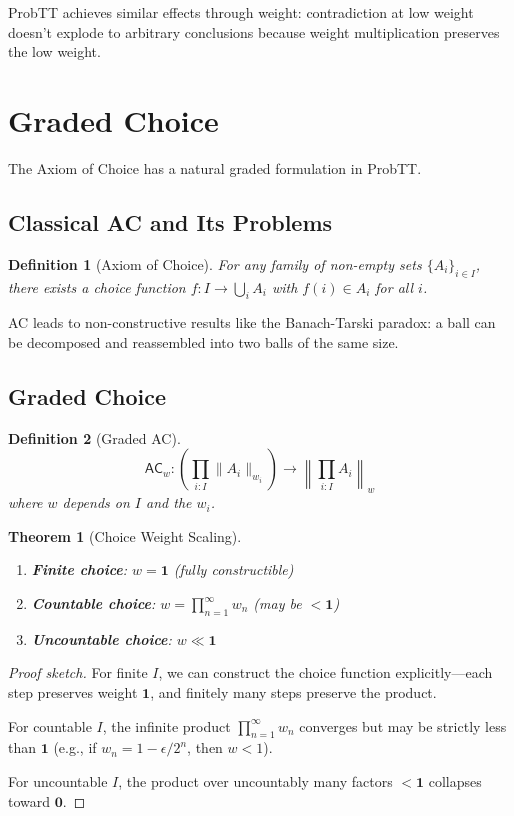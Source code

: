 \documentclass[11pt,a4paper]{article}
\newtheorem{definition}{Definition}[section]
\newtheorem{theorem}{Theorem}[section]
\newcommand{\one}{\mathbf{1}}
\newcommand{\zero}{\mathbf{0}}
\begin{document}
ProbTT achieves similar effects through weight: contradiction at low weight doesn't explode to arbitrary conclusions because weight multiplication preserves the low weight.

\section{Graded Choice}

The Axiom of Choice has a natural graded formulation in ProbTT.

\subsection{Classical AC and Its Problems}

\begin{definition}[Axiom of Choice]
For any family of non-empty sets $\{A_i\}_{i \in I}$, there exists a choice function $f : I \to \bigcup_i A_i$ with $f(i) \in A_i$ for all $i$.
\end{definition}

AC leads to non-constructive results like the Banach-Tarski paradox: a ball can be decomposed and reassembled into two balls of the same size.

\subsection{Graded Choice}

\begin{definition}[Graded AC]
\[
\mathsf{AC}_w : \left(\prod_{i:I} \|A_i\|_{w_i}\right) \to \left\|\prod_{i:I} A_i\right\|_w
\]
where $w$ depends on $I$ and the $w_i$.
\end{definition}

\begin{theorem}[Choice Weight Scaling]
\begin{enumerate}
    \item \textbf{Finite choice}: $w = \one$ (fully constructible)
    \item \textbf{Countable choice}: $w = \prod_{n=1}^\infty w_n$ (may be $< \one$)
    \item \textbf{Uncountable choice}: $w \ll \one$
\end{enumerate}
\end{theorem}

\begin{proof}[Proof sketch]
For finite $I$, we can construct the choice function explicitly---each step preserves weight $\one$, and finitely many steps preserve the product.

For countable $I$, the infinite product $\prod_{n=1}^\infty w_n$ converges but may be strictly less than $\one$ (e.g., if $w_n = 1 - \epsilon/2^n$, then $w < 1$).

For uncountable $I$, the product over uncountably many factors $< \one$ collapses toward $\zero$.
\end{proof}
\end{document}

